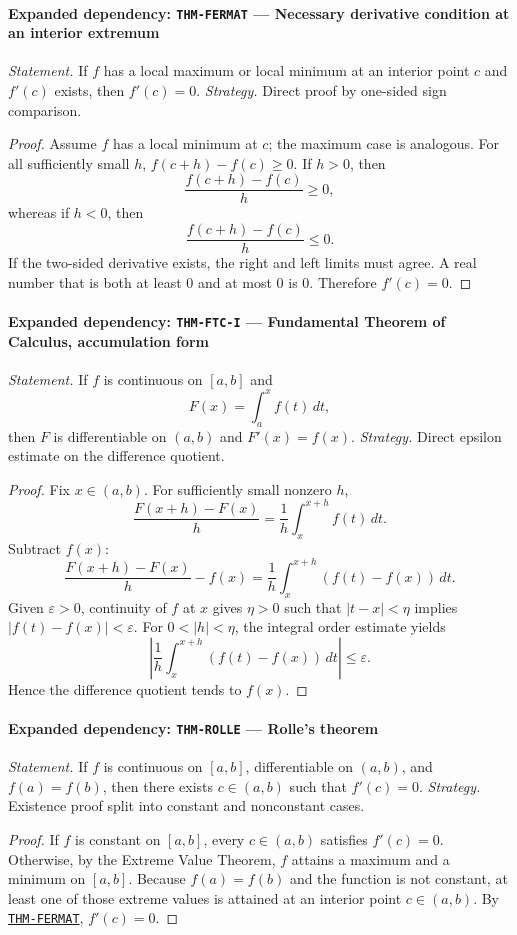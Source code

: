 \documentclass[10pt]{article}
\newcommand{\pidraw}[1]{\begingroup\urlstyle{tt}\nolinkurl{#1}\endgroup}
\newcommand{\pidref}[1]{\hyperref[prf:#1]{\pidraw{#1}}}
\newcommand{\pid}[1]{\pidref{#1}}
\theoremstyle{definition}
\theoremstyle{remark}
\begin{document}
\paragraph{Expanded dependency: \pidraw{THM-FERMAT} --- Necessary derivative condition at an interior extremum}
\textit{Statement.} If $f$ has a local maximum or local minimum at an interior point $c$ and $f'(c)$ exists, then $f'(c)=0$.
\textit{Strategy.} Direct proof by one-sided sign comparison.
\begin{proof}Assume $f$ has a local minimum at $c$; the maximum case is analogous.
For all sufficiently small $h$,
$f(c+h)-f(c)\ge0$. If $h>0$, then
\[
\frac{f(c+h)-f(c)}{h}\ge0,
\]
whereas if $h<0$, then
\[
\frac{f(c+h)-f(c)}{h}\le0.
\]
If the two-sided derivative exists, the right and left limits must agree.
A real number that is both at least $0$ and at most $0$ is $0$.
Therefore $f'(c)=0$.\end{proof}

\paragraph{Expanded dependency: \pidraw{THM-FTC-I} --- Fundamental Theorem of Calculus, accumulation form}
\textit{Statement.} If $f$ is continuous on $[a,b]$ and
\[
F(x)=\int_a^x f(t)\,dt,
\]
then $F$ is differentiable on $(a,b)$ and $F'(x)=f(x)$.
\textit{Strategy.} Direct epsilon estimate on the difference quotient.
\begin{proof}Fix $x\in(a,b)$. For sufficiently small nonzero $h$,
\[
\frac{F(x+h)-F(x)}{h}
=
\frac1h\int_x^{x+h}f(t)\,dt.
\]
Subtract $f(x)$:
\[
\frac{F(x+h)-F(x)}{h}-f(x)
=
\frac1h\int_x^{x+h}(f(t)-f(x))\,dt.
\]
Given $\varepsilon>0$, continuity of $f$ at $x$ gives $\eta>0$ such that
$|t-x|<\eta$ implies $|f(t)-f(x)|<\varepsilon$. For $0<|h|<\eta$, the
integral order estimate yields
\[
\left|
\frac1h\int_x^{x+h}(f(t)-f(x))\,dt
\right|
\le \varepsilon.
\]
Hence the difference quotient tends to $f(x)$.\end{proof}

\paragraph{Expanded dependency: \pidraw{THM-ROLLE} --- Rolle's theorem}
\textit{Statement.} If $f$ is continuous on $[a,b]$, differentiable on $(a,b)$, and $f(a)=f(b)$, then there exists $c\in(a,b)$ such that $f'(c)=0$.
\textit{Strategy.} Existence proof split into constant and nonconstant cases.
\begin{proof}If $f$ is constant on $[a,b]$, every $c\in(a,b)$ satisfies $f'(c)=0$.
Otherwise, by the Extreme Value Theorem, $f$ attains a maximum and a minimum
on $[a,b]$. Because $f(a)=f(b)$ and the function is not constant, at least one
of those extreme values is attained at an interior point $c\in(a,b)$.
By \pid{THM-FERMAT}, $f'(c)=0$.\end{proof}
\end{document}
